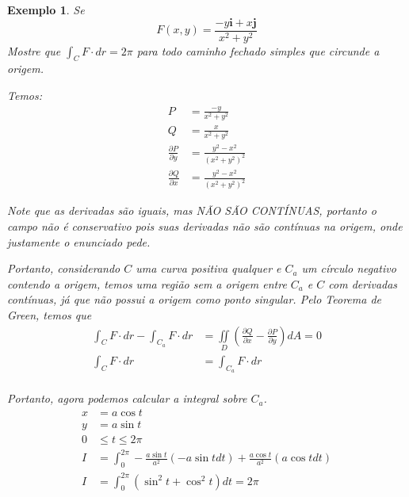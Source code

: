 \documentclass{article}
\newcommand{\doubleint}[2] {\iint\limits_{#1} #2}
\newcommand{\PartialDer}[2] {\frac{\partial #1}{\partial #2}}
\newtheorem{example}{Exemplo}[section]
\begin{document}
        \begin{example}
            Se
            \[
                F(x,y) = \frac{-y\textbf{i} + x\textbf{j}}{x^2 + y^2}
            \]
            Mostre que $\int_C F \cdot dr = 2\pi$ para todo caminho fechado simples que circunde a origem.

            Temos:
            \begin{align*}
                P &= \frac{-y}{x^2 + y^2}\\
                Q &= \frac{x}{x^2 + y^2}\\
                \PartialDer{P}{y} &= \frac{y^2 - x^2}{(x^2 + y^2)^2}\\
                \PartialDer{Q}{x} &= \frac{y^2 - x^2}{(x^2 + y^2)^2}
            \end{align*}

            Note que as derivadas são iguais, mas NÃO SÃO CONTÍNUAS, portanto o campo não é conservativo pois suas derivadas
            não são contínuas na origem, onde justamente o enunciado pede.

            Portanto, considerando $C$ uma curva positiva qualquer e $C_a$ um círculo negativo contendo a origem, temos uma região
            sem a origem entre $C_a$ e $C$ com derivadas contínuas, já que não possui a origem como ponto singular. Pelo Teorema
            de Green, temos que
            \begin{align*}
                \int_C F \cdot dr - \int_{C_a} F \cdot dr &= \doubleint{D}{\left( \PartialDer{Q}{x} - \PartialDer{P}{y} \right) dA} = 0\\
                \int_C F \cdot dr &= \int_{C_a} F \cdot dr\\
            \end{align*}

            Portanto, agora podemos calcular a integral sobre $C_a$.
            \begin{align*}
                x &= a \cos t\\
                y &= a \sin t\\
                0 &\leq t \leq 2\pi\\
                I &= \int_0^{2\pi} - \frac{a \sin t}{a^2} (-a \sin t dt) + \frac{a \cos t}{a^2} (a \cos t dt)\\
                I &= \int_0^{2\pi} (\sin^2 t + \cos^2 t) dt = 2\pi
            \end{align*}
        \end{example}
\end{document}
